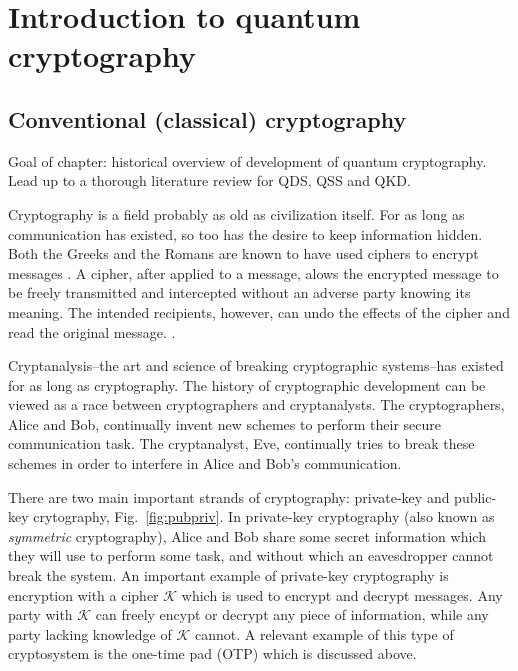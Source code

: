 \chapter{Introduction to quantum cryptography}\label{chapter:crypto_intro}

\section{Conventional (classical) cryptography}
Goal of chapter: historical overview of development of quantum cryptography. Lead up to a thorough literature review for QDS, QSS and QKD.

Cryptography is a field probably as old as civilization itself. For as long as communication has existed, so too has the desire to keep information hidden. Both the Greeks and the Romans are known to have used ciphers to encrypt messages . A cipher, after applied to a message, alows the encrypted message to be freely transmitted and intercepted without an adverse party knowing its meaning. The intended recipients, however, can undo the effects of the cipher and read the original message. .

Cryptanalysis--the art and science of breaking cryptographic systems--has existed for as long as cryptography. The history of cryptographic development can be viewed as a race between cryptographers and cryptanalysts. The cryptographers, Alice and Bob, continually invent new schemes to perform their secure communication task. The cryptanalyst, Eve, continually tries to break these schemes in order to interfere in Alice and Bob's communication.

There are two main important strands of cryptography: private-key and public-key crytography, Fig.~\ref{fig:pubpriv}. In private-key cryptography (also known as \emph{symmetric} cryptography), Alice and Bob share some secret information which they will use to perform some task, and without which an eavesdropper cannot break the system. An important example of private-key cryptography is encryption with a cipher $\mathcal{K}$ which is used to encrypt and decrypt messages. Any party with $\mathcal{K}$ can freely encypt or decrypt any piece of information, while any party lacking knowledge of $\mathcal{K}$ cannot. A relevant example of this type of cryptosystem is the one-time pad (OTP) which is discussed above.


